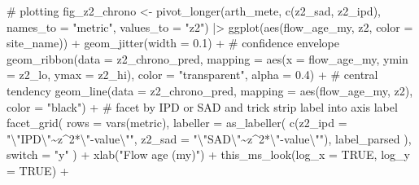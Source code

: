 \documentclass[
  letterpaper,
  DIV=11,
  numbers=noendperiod]{scrartcl}
\newenvironment{Shaded}{\begin{snugshade}}{\end{snugshade}}
\newcommand{\AttributeTok}[1]{\textcolor[rgb]{0.40,0.45,0.13}{#1}}
\newcommand{\CommentTok}[1]{\textcolor[rgb]{0.37,0.37,0.37}{#1}}
\newcommand{\ConstantTok}[1]{\textcolor[rgb]{0.56,0.35,0.01}{#1}}
\newcommand{\FloatTok}[1]{\textcolor[rgb]{0.68,0.00,0.00}{#1}}
\newcommand{\FunctionTok}[1]{\textcolor[rgb]{0.28,0.35,0.67}{#1}}
\newcommand{\NormalTok}[1]{\textcolor[rgb]{0.00,0.23,0.31}{#1}}
\newcommand{\OtherTok}[1]{\textcolor[rgb]{0.00,0.23,0.31}{#1}}
\newcommand{\SpecialCharTok}[1]{\textcolor[rgb]{0.37,0.37,0.37}{#1}}
\newcommand{\StringTok}[1]{\textcolor[rgb]{0.13,0.47,0.30}{#1}}
\begin{document}
\begin{Shaded}
\begin{Highlighting}[]
\CommentTok{\# plotting}
\NormalTok{fig\_z2\_chrono }\OtherTok{\textless{}{-}} \FunctionTok{pivot\_longer}\NormalTok{(arth\_mete, }\FunctionTok{c}\NormalTok{(z2\_sad, z2\_ipd), }
             \AttributeTok{names\_to =} \StringTok{"metric"}\NormalTok{, }\AttributeTok{values\_to =} \StringTok{"z2"}\NormalTok{) }\SpecialCharTok{|\textgreater{}} 
    \FunctionTok{ggplot}\NormalTok{(}\FunctionTok{aes}\NormalTok{(flow\_age\_my, z2, }\AttributeTok{color =}\NormalTok{ site\_name)) }\SpecialCharTok{+}
    \FunctionTok{geom\_jitter}\NormalTok{(}\AttributeTok{width =} \FloatTok{0.1}\NormalTok{) }\SpecialCharTok{+}
    \CommentTok{\# confidence envelope }
    \FunctionTok{geom\_ribbon}\NormalTok{(}\AttributeTok{data =}\NormalTok{ z2\_chrono\_pred, }
                \AttributeTok{mapping =} \FunctionTok{aes}\NormalTok{(}\AttributeTok{x =}\NormalTok{ flow\_age\_my, }
                              \AttributeTok{ymin =}\NormalTok{ z2\_lo, }
                              \AttributeTok{ymax =}\NormalTok{ z2\_hi), }
                \AttributeTok{color =} \StringTok{"transparent"}\NormalTok{, }\AttributeTok{alpha =} \FloatTok{0.4}\NormalTok{) }\SpecialCharTok{+}
    \CommentTok{\# central tendency }
    \FunctionTok{geom\_line}\NormalTok{(}\AttributeTok{data =}\NormalTok{ z2\_chrono\_pred, }
              \AttributeTok{mapping =} \FunctionTok{aes}\NormalTok{(flow\_age\_my, z2), }
              \AttributeTok{color =} \StringTok{"black"}\NormalTok{) }\SpecialCharTok{+}
    \CommentTok{\# facet by IPD or SAD and trick strip label into axis label}
    \FunctionTok{facet\_grid}\NormalTok{(}
        \AttributeTok{rows =} \FunctionTok{vars}\NormalTok{(metric), }
        \AttributeTok{labeller =} \FunctionTok{as\_labeller}\NormalTok{(}
            \FunctionTok{c}\NormalTok{(}\AttributeTok{z2\_ipd =} \StringTok{"}\SpecialCharTok{\textbackslash{}"}\StringTok{IPD}\SpecialCharTok{\textbackslash{}"}\StringTok{\textasciitilde{}z\^{}2*}\SpecialCharTok{\textbackslash{}"}\StringTok{{-}value}\SpecialCharTok{\textbackslash{}"}\StringTok{"}\NormalTok{, }
              \AttributeTok{z2\_sad =} \StringTok{"}\SpecialCharTok{\textbackslash{}"}\StringTok{SAD}\SpecialCharTok{\textbackslash{}"}\StringTok{\textasciitilde{}z\^{}2*}\SpecialCharTok{\textbackslash{}"}\StringTok{{-}value}\SpecialCharTok{\textbackslash{}"}\StringTok{"}\NormalTok{),}
\NormalTok{            label\_parsed}
\NormalTok{        ), }
        \AttributeTok{switch =} \StringTok{"y"}
\NormalTok{    ) }\SpecialCharTok{+}
    \FunctionTok{xlab}\NormalTok{(}\StringTok{"Flow age (my)"}\NormalTok{) }\SpecialCharTok{+}
    \FunctionTok{this\_ms\_look}\NormalTok{(}\AttributeTok{log\_x =} \ConstantTok{TRUE}\NormalTok{, }\AttributeTok{log\_y =} \ConstantTok{TRUE}\NormalTok{) }\SpecialCharTok{+}

\end{Highlighting}
\end{Shaded}
\end{document}
